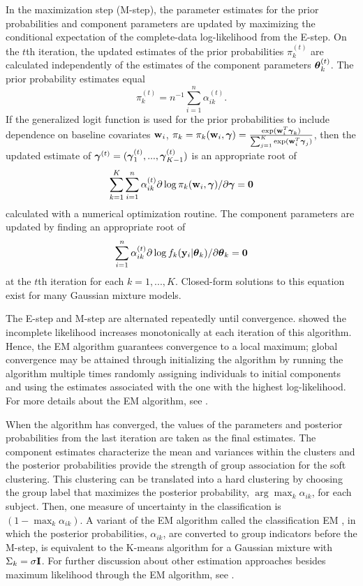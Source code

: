 In the maximization step (M-step), the parameter estimates for the prior probabilities and component parameters are updated by maximizing the conditional expectation of the complete-data log-likelihood from the E-step. On the $t$th iteration, the updated estimates of the prior probabilities $\pi_{k}^{(t)}$ are calculated independently of the estimates of the component parameters $\boldsymbol\theta_{k}^{(t)}$. The prior probability estimates equal 
$$\pi_{k}^{(t)}=n^{-1}\sum^{n}_{i=1}\alpha_{ik}^{(t)}.$$
If the generalized logit function is used for the prior probabilities to include dependence on baseline covariates $\mathbf w_{i}$, $\pi_{k}=\pi_{k}(\mathbf w_{i},\boldsymbol\gamma) = \frac{\exp(\mathbf w_{i}^T \boldsymbol \gamma_k) }{\sum_{j=1}^K \exp(\mathbf w_{i}^T \boldsymbol \gamma_j)}$, then the updated estimate of $\boldsymbol\gamma^{(t)}=(\boldsymbol\gamma_{1}^{(t)},...,\boldsymbol\gamma_{K-1}^{(t)})$ is an appropriate root of 
$$\sum^{K}_{k=1}\sum^{n}_{i=1}\alpha_{ik}^{(t)}\partial\log \pi_{k}(\mathbf w_{i},\boldsymbol\gamma)/\partial \boldsymbol\gamma = \mathbf 0$$
calculated with a numerical optimization routine. The component parameters are updated by finding an appropriate root of 
$$\sum^{n}_{i=1}\alpha_{ik}^{(t)}\partial\log f_{k}(\mathbf y_{i}|\boldsymbol\theta_k) /\partial \boldsymbol\theta_{k} =\mathbf 0$$
at the $t$th iteration for each $k=1,...,K$. Closed-form solutions to this equation exist for many Gaussian mixture models.  

The E-step and M-step are alternated repeatedly until convergence. \Textcite{dempster1977} showed the incomplete likelihood increases monotonically at each iteration of this algorithm. Hence, the EM algorithm guarantees convergence to a local maximum; global convergence may be attained through initializing the algorithm by running the algorithm multiple times randomly assigning individuals to initial components and using the estimates associated with the one with the highest log-likelihood. For more details about the EM algorithm, see \textcite{mclachlan1997}. 

When the algorithm has converged, the values of the parameters and posterior probabilities from the last iteration are taken as the final estimates. The component estimates characterize the mean and variances within the clusters and the posterior probabilities provide the strength of group association for the soft clustering. This clustering can be translated into a hard clustering by choosing the group label that maximizes the posterior probability, $\arg\max_k \alpha_{ik}$, for each subject. Then, one measure of uncertainty in the classification is $(1-\max_k\alpha_{ik}).$ A variant of the EM algorithm called the classification EM \cite{celeux1992}, in which the posterior probabilities, $\alpha_{ik}$, are converted to group indicators before the M-step, is equivalent to the K-means algorithm for a Gaussian mixture with $\Sigma_{k} =\sigma \mathbf I$. For further discussion about other estimation approaches besides maximum likelihood through the EM algorithm, see \textcite{mclachlan2000}.

